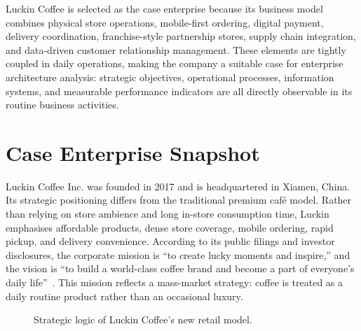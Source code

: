 \documentclass[12pt,a4paper]{article}
\begin{document}
Luckin Coffee is selected as the case enterprise because its business model combines physical store operations, mobile-first ordering, digital payment, delivery coordination, franchise-style partnership stores, supply chain integration, and data-driven customer relationship management. These elements are tightly coupled in daily operations, making the company a suitable case for enterprise architecture analysis: strategic objectives, operational processes, information systems, and measurable performance indicators are all directly observable in its routine business activities.

\section{Case Enterprise Snapshot}

Luckin Coffee Inc. was founded in 2017 and is headquartered in Xiamen, China. Its strategic positioning differs from the traditional premium caf\'{e} model. Rather than relying on store ambience and long in-store consumption time, Luckin emphasises affordable products, dense store coverage, mobile ordering, rapid pickup, and delivery convenience. According to its public filings and investor disclosures, the corporate mission is ``to create lucky moments and inspire,'' and the vision is ``to build a world-class coffee brand and become a part of everyone's daily life''~\cite{luckin2025annual}. This mission reflects a mass-market strategy: coffee is treated as a daily routine product rather than an occasional luxury.

\begin{figure}[H]
  \centering
  \caption{Strategic logic of Luckin Coffee's new retail model.}
\end{figure}
\end{document}

